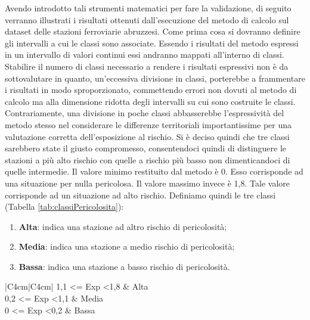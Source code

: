Avendo introdotto tali strumenti matematici per fare la validazione, di seguito verranno illustrati i risultati ottenuti dall'esecuzione del metodo di calcolo sul dataset delle stazioni ferroviarie abruzzesi.
Come prima cosa si dovranno definire gli intervalli a cui le classi sono associate.
Essendo i risultati del metodo espressi in un intervallo di valori continui essi andranno mappati all'interno di classi. Stabilire il numero di classi necessario a rendere i risultati espressivi non è da sottovalutare in quanto, un'eccessiva divisione in classi, porterebbe a frammentare i risultati in modo sproporzionato, commettendo errori non dovuti al metodo di calcolo ma alla dimensione ridotta degli intervalli su cui sono costruite le classi. Contrariamente, una divisione in poche classi abbasserebbe l'espressività del metodo stesso nel considerare le differenze territoriali importantissime per una valutazione corretta dell'esposizione al rischio.
Si è deciso quindi che tre classi sarebbero state il giusto compromesso, consentendoci quindi di distinguere le stazioni a più alto rischio con quelle a rischio più basso non dimenticandoci di quelle intermedie. Il valore minimo restituito dal metodo è 0. Esso corrisponde ad una situazione per nulla pericolosa. Il valore massimo invece è 1,8. Tale valore corrisponde ad un situazione ad alto rischio. Definiamo quindi le tre classi (Tabella \ref{tab:classiPericolosita}):


\begin{enumerate}
	\item \textbf{Alta}: indica una stazione ad altro rischio di pericolosità;
	\item \textbf{Media}: indica una stazione a medio rischio di pericolosità;
	\item \textbf{Bassa}: indica una stazione a basso rischio di pericolosità.
\end{enumerate}

\begin{table}[H]
	\centering
	\renewcommand{\arraystretch}{1.2}
	
	\begin{tabular}{|C{4cm}|C{4cm}|}
		\hline
		1,1 \textless= Exp \textless 1,8 & Alta  \\ \hline
		0,2 \textless= Exp \textless 1,1 & Media \\ \hline
		0 \textless= Exp \textless 0,2   & Bassa \\ \hline
	\end{tabular}
	\caption{Classi di pericolosità.}
	\label{tab:classiPericolosita}
\end{table}




